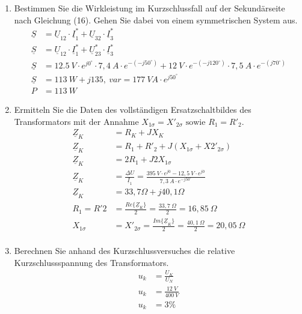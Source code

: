 \begin{enumerate}[label=\alph*)]
	\item Bestimmen Sie die Wirkleistung im Kurzschlussfall auf der Sekundärseite nach
	      Gleichung (16). Gehen Sie dabei von einem symmetrischen System aus.
	      \begin{align*}
		      \underline S & = \underline U_{12} \cdot \underline I_1^* + \underline U_{32}\cdot \underline I_3^*   \\
		      \underline S & = \underline U_{12} \cdot \underline I_1^* + \underline U_{23}^*\cdot \underline I_3^* \\
		      \underline S & = 12.5\ V \cdot e^{j0^\circ} \cdot 7,4\ A \cdot e^{-(-j50^\circ)}
		      + 12\ V \cdot e^{-(-j120^\circ)}\cdot 7,5\ A \cdot e^{-(j70^\circ)}                                   \\
		      \underline S & = 113\ W+j 135,\ var = 177\ VA \cdot e^{j50^\circ}                                     \\
		      P            & = 113\ W
	      \end{align*}

	\item Ermitteln Sie die Daten des vollständigen Ersatzschaltbildes des Transformators
	      mit der Annahme $X_{1\sigma} = X'_{2\sigma} \text{ sowie } R_1 = R'_2$.
	      \begin{align*}
		      \underline Z_K & = R_K + JX_{K}                                                                                 \\
		      \underline Z_K & = R_1 + R'_2 + J(X_{1\sigma} + X2'_{2\sigma})                                                  \\
		      \underline Z_K & = 2R_1 + J2X_{1\sigma}                                                                         \\
		      \underline Z_K & = \frac{\underline \Delta U}{\underline I_1} = \frac{395\ V\cdot e^{j0} - 12,5\ V\cdot e^{j0}}
		      {7,3\ A \cdot e^{-j50^\circ}}                                                                                   \\
		      \underline Z_K & = 33,7 \Omega + j40,1 \Omega                                                                  \\
		      R_1 = R'2      & = \frac {Re\{\underline Z_K\}}{2} = \frac{33,7\ \Omega}{2} = 16,85\ \Omega                     \\
		      X_{1\sigma}    & = X'_{2\sigma} = \frac {Im\{\underline Z_K\}}{2} = \frac{40,1\ \Omega}{2} = 20,05\ \Omega       \\
	      \end{align*}

	\item Berechnen Sie anhand des Kurzschlussversuches die relative Kurzschlussspannung
	      des Transformators.
        \begin{align*}
          u_k &= \frac{U_K}{U_N}\\
          u_k &= \frac{12\ V}{400\ V}\\
          u_k &= 3\%
        \end{align*}

\end{enumerate}
